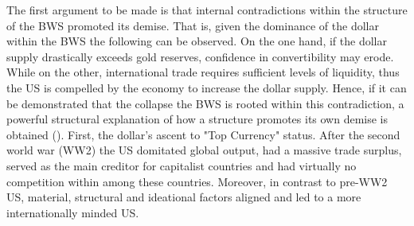 \documentclass[11pt]{article}
\begin{document}
The first argument to be made is that internal contradictions within the structure of the  BWS promoted its demise. 
That is, given the dominance of the dollar within the BWS the following can be observed.
On the one hand,  if the dollar supply drastically exceeds gold reserves, confidence in convertibility may erode. While on the other, international trade requires sufficient levels of liquidity, thus the US is compelled by the economy to increase the dollar supply. Hence, if it can be demonstrated that the collapse the BWS is rooted within this contradiction, a powerful structural explanation of how a structure promotes its own demise is obtained
(\cite{KlimiukZbigniew2016TPaO,bordo2014tales}).  
First, the dollar's ascent to "Top Currency" status.
After the second world war (WW2) the US domitated global output, had a massive trade surplus, served as the main creditor for capitalist countries and had virtually no competition within among these countries.
Moreover, in contrast to pre-WW2 US, material, structural and ideational factors aligned and led to a more internationally minded US.
\end{document}
